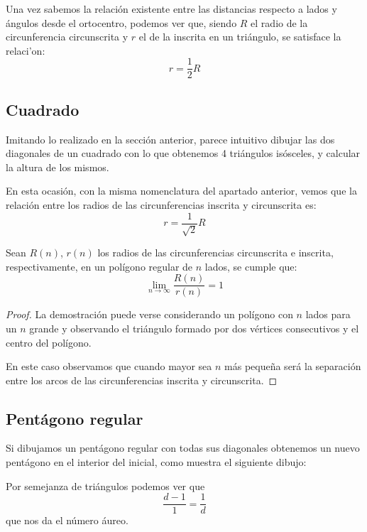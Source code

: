 \documentclass{apuntes}
\begin{document}
Una vez sabemos la relación existente entre las distancias respecto a lados y ángulos desde el ortocentro, podemos ver que, siendo $R$ el radio de la circunferencia circunscrita y $r$ el de la inscrita en un triángulo, se satisface la relaci'on:
\[r = \frac{1}{2} R\]

\subsection{Cuadrado}
Imitando lo realizado en la sección anterior, parece intuitivo dibujar las dos diagonales de un cuadrado con lo que obtenemos 4 triángulos isósceles, y calcular la altura de los mismos.

\begin{center}
\end{center}

En esta ocasión, con la misma nomenclatura del apartado anterior, vemos que la relación entre los radios de las circunferencias inscrita y circunscrita es:
\[r = \frac{1}{\sqrt{2}}R\]

\begin{theorem}
Sean $R(n)$, $r(n)$ los radios de las circunferencias circunscrita e inscrita, respectivamente, en un polígono regular de $n$ lados, se cumple que:
\[\lim_{n\to \infty} \frac{R(n)}{r(n)}=1\]
\end{theorem}
\begin{proof}
La demostración puede verse considerando un polígono con $n$ lados para un $n$ grande y observando el triángulo formado por dos vértices consecutivos y el centro del polígono.

En este caso observamos que cuando mayor sea $n$ más pequeña será la separación entre los arcos de las circunferencias inscrita y circunscrita.
\end{proof}

\subsection{Pentágono regular}

Si dibujamos un pentágono regular con todas sus diagonales obtenemos un nuevo pentágono en el interior del inicial, como muestra el siguiente dibujo:


\begin{minipage}{0.56\textwidth}
\begin{center}
\end{center}
\end{minipage}
\begin{minipage}{0.43\textwidth}
Por semejanza de triángulos podemos ver que
\[\frac{d-1}{1} = \frac{1}{d}\]
que nos da el número áureo.
\end{minipage}
\end{document}
